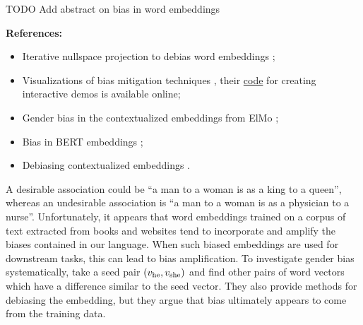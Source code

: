 \documentclass[11pt, a4paper]{amsart}
\begin{document}
TODO Add abstract on bias in word embeddings

\noindent \textbf{References:}
\begin{itemize}
	\item Iterative nullspace projection to debias word embeddings \cite{ravfogel-etal-2020-null};
	\item Visualizations of bias mitigation techniques \cite{DBLP:journals/corr/abs-2104-02797},
	their \href{https://github.com/tdavislab/verb}{code} for creating interactive demos is available online;
	\item Gender bias in the contextualized embeddings from ElMo \cite{zhao-etal-2019-gender};
	\item Bias in BERT embeddings \cite{kurita-etal-2019-measuring};
	\item Debiasing contextualized embeddings \cite{kaneko-bollegala-2021-debiasing}.
\end{itemize}

{
	\color{blue}
	
	A desirable association could be ``a man to a woman is as a king to a queen'', whereas an undesirable association is ``a man to a woman is as a physician to a nurse''.
	Unfortunately, it appears that word embeddings trained on a corpus of text extracted from books and websites tend to incorporate and amplify the biases contained in our language.
	When such biased embeddings are used for downstream tasks, this can lead to bias amplification.
	To investigate gender bias systematically, \cite{DBLP:journals/corr/BolukbasiCZSK16a} take a seed pair $(v_\textup{he}, v_\textup{she})$ and find other pairs of word vectors which have a difference similar to the seed vector.
	They also provide methods for debiasing the embedding, but they argue that bias ultimately appears to come from the training data.
} %

\end{document}
